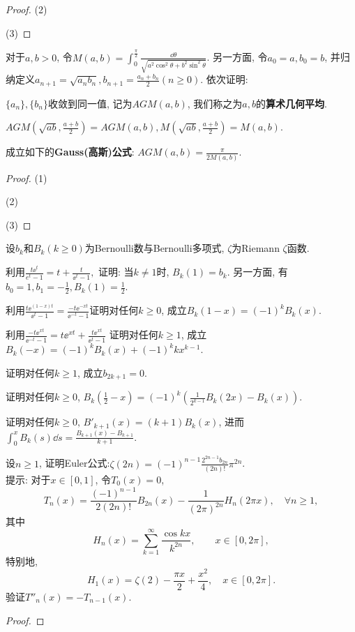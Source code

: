 \begin{quizb}
\begin{proof}
(2)

(3)
\end{proof}
\woe 对于\(a,b>0\), 令\(M(a,b)=\int_{0}^{\frac{\pi}{2}}\frac{\dd\theta}{\sqrt{a^2\cos^2\theta+b^2\sin^2\theta}}\). 另一方面, 令\(a_0=a,b_0=b\), 并归纳定义\(a_{n+1}=\sqrt{a_nb_n},b_{n+1}=\frac{a_n+b_n}{2}(n\geqslant 0)\). 依次证明:\begin{quizs}
\item \(\{a_n\},\{b_n\}\)收敛到同一值, 记为\(AGM(a,b)\), 我们称之为\(a,b\)的\textbf{算术几何平均}.
\item \(AGM\left(\sqrt{ab},\frac{a+b}{2}\right)=AGM(a,b),M\left(\sqrt{ab},\frac{a+b}{2}\right)=M(a,b)\).
\item 成立如下的\textbf{Gauss(高斯)公式}: \(AGM(a,b)=\frac{\pi}{2M(a,b)}\).
\end{quizs}
\begin{proof}
(1)

(2)

(3)
\end{proof}
\woe 设\(b_k\)和\(B_k(k\geqslant 0)\)为Bernoulli数与Bernoulli多项式, \(\zeta\)为Riemann \(\zeta\)函数.\begin{quizs}
\item 利用\(\frac{t\ee^t}{e^t-1}=t+\frac{t}{\ee^t-1},\) 证明: 当\(k\ne 1\)时, \(B_k(1)=b_k\). 另一方面, 有\(b_0=1,b_1=-\frac{1}{2},B_k(1)=\frac{1}{2}\).
\item 利用\(\frac{t\ee^{(1-x)t}}{\ee^t-1}=\frac{-t\ee^{-xt}}{\ee^{-t}-1}\)证明对任何\(k\geqslant 0\), 成立\(B_k(1-x)=(-1)^kB_k(x)\).
\item 利用\(\frac{-t\ee^{xt}}{\ee^{-t}-1}=t\ee^{xt}+\frac{t\ee^{xt}}{\ee^t-1}\) 证明对任何\(k\geqslant 1\), 成立\(B_k(-x)=(-1)^kB_k(x)+(-1)^kkx^{k-1}\).
\item 证明对任何\(k\geqslant 1\), 成立\(b_{2k+1}=0\).
\item 证明对任何\(k\geqslant 0\), \(B_k\left(\frac{1}{2}-x\right)=(-1)^k\left(\frac{1}{2^{k-1}}B_k(2x)-B_k(x)\right)\).
\item 证明对任何\(k\geqslant 0,\,B'_{k+1}(x)=(k+1)B_k(x)\), 进而\(\int_{0}^{x}B_k(s)\dd s=\frac{B_{k+1}(x)-B_{k+1}}{k+1}\).
\item 设\(n\geqslant 1\), 证明Euler公式:\(\zeta(2n)=(-1)^{n-1}\frac{2^{2n-1}b_{2n}}{(2n)!}\pi^{2n}\).
\\提示: 对于\(x\in[0,1]\), 令\(T_0(x)=0\),\[T_n(x)=\frac{(-1)^{n-1}}{2(2n)!}B_{2n}(x)-\frac{1}{(2\pi)^{2n}}H_{n}(2\pi x),\quad\forall n\geqslant 1,\]其中\[H_n(x)=\sum_{k=1}^{\infty}\frac{\cos kx}{k^{2n}},\qquad x\in[0,2\pi],\]特别地,\[H_1(x)=\zeta(2)-\frac{\pi x}{2}+\frac{x^2}{4},\quad x\in[0,2\pi].\]验证\(T''_n(x)=-T_{n-1}(x)\).
\end{quizs}
\begin{proof}


\end{proof}
\end{quizb}
